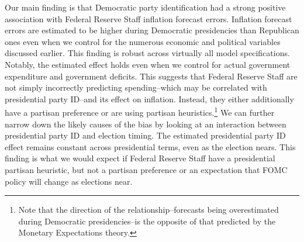 \documentclass[a4paper]{article}
\begin{document}
Our main finding is that Democratic party identification had a strong positive association with Federal Reserve Staff inflation forecast errors. Inflation forecast errors are estimated to be higher during Democratic presidencies than Republican ones even when we control for the numerous economic and political variables discussed earlier. This finding is robust across virtually all model specifications. Notably, the estimated effect holds even when we control for actual government expenditure and government deficits. This suggests that Federal Reserve Staff are not simply incorrectly predicting spending--which may be correlated with presidential party ID--and its effect on inflation. Instead, they either additionally have a partisan preference or are using partisan heuristics.\footnote{Note that the direction of the relationship--forecasts being overestimated during Democratic presidencies--is the opposite of that predicted by the Monetary Expectations theory.} We can further narrow down the likely causes of the bias by looking at an interaction between presidential party ID and election timing. The estimated presidential party ID effect remains constant across presidential terms, even as the election nears. This finding is what we would expect if Federal Reserve Staff have a presidential partisan heuristic, but not a partisan preference or an expectation that FOMC policy will change as elections near.
\end{document}
